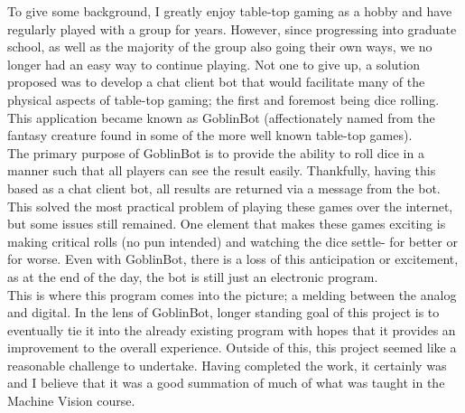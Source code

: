 \documentclass[journal]{IEEEtran}
\begin{document}
To give some background, I greatly enjoy table-top gaming as a hobby and have regularly played with a group for years. However, since progressing into graduate school, as well as the majority of the group also going their own ways, we no longer had an easy way to continue playing. Not one to give up, a solution proposed was to develop a chat client bot that would facilitate many of the physical aspects of table-top gaming; the first and foremost being dice rolling. This application became known as GoblinBot (affectionately named from the fantasy creature found in some of the more well known table-top games).\\

The primary purpose of GoblinBot is to provide the ability to roll dice in a manner such that all players can see the result easily. Thankfully, having this based as a chat client bot, all results are returned via a message from the bot. This solved the most practical problem of playing these games over the internet, but some issues still remained. One element that makes these games exciting is making critical rolls (no pun intended) and watching the dice settle- for better or for worse. Even with GoblinBot, there is a loss of this anticipation or excitement, as at the end of the day, the bot is still just an electronic program.\\

This is where this program comes into the picture; a melding between the analog and digital. In the lens of GoblinBot, longer standing goal of this project is to eventually tie it into the already existing program with hopes that it provides an improvement to the overall experience. Outside of this, this project seemed like a reasonable challenge to undertake. Having completed the work, it certainly was and I believe that it was a good summation of much of what was taught in the Machine Vision course.\\



%
%
\end{document}
